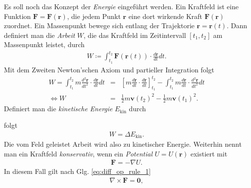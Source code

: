 \documentclass{book}
\begin{document}
Es soll noch das Konzept der \textit{Energie} eingeführt werden. Ein Kraftfeld ist eine Funktion $\mathbf{F} = \mathbf{F}\left(\mathbf{r}\right)$, die jedem Punkt $\mathbf{r}$ eine dort wirkende Kraft $\mathbf{F}\left(\mathbf{r}\right)$ zuordnet. Ein Massenpunkt bewege sich entlang der Trajektorie $\mathbf{r} = \mathbf{r}\left(t\right)$. Dann definiert man die \textit{Arbeit} $W$, die das Kraftfeld im Zeitintervall $\left[t_1, t_2\right]$ am Massenpunkt leistet, durch
%
\begin{eqnarray}
W \coloneqq \int_{t_1}^{t_2}\mathbf{F}\left(\mathbf{r}\left(t\right)\right)\cdot\frac{d\mathbf{r}}{dt}dt.
\end{eqnarray}
%
Mit dem Zweiten Newton'schen Axiom und partieller Integration folgt
%
\begin{eqnarray}
W = \int_{t_1}^{t_2}m\frac{d^2\mathbf{r}}{dt^2}\cdot\frac{d\mathbf{r}}{dt}dt & = & \left[m\frac{d\mathbf{r}}{dt}\cdot\frac{d\mathbf{r}}{dt}\right]_{t_1}^{t_2} - \int_{t_1}^{t_2}m\frac{d\mathbf{r}}{dt}\cdot\frac{d^2\mathbf{r}}{dt^2}dt\nonumber\\
\Leftrightarrow W & = & \frac{1}{2}m\mathbf{v}\left(t_2\right)^2 - \frac{1}{2}m\mathbf{v}\left(t_1\right)^2.
\end{eqnarray}
%
Definiert man die \textit{kinetische Energie} $E_{\text{kin}}$ durch
%
\begin{center}
\end{center}
%
folgt
%
\begin{eqnarray}
W = \Delta E_{\text{kin}}.
\end{eqnarray}
%
Die vom Feld geleistet Arbeit wird also zu kinetischer Energie. Weiterhin nennt man ein Kraftfeld \textit{konservativ},  wenn ein \textit{Potential} $U = U\left(\mathbf{r}\right)$ existiert mit
%
\begin{eqnarray}
\mathbf{F} = -\nabla U.
\end{eqnarray}
%
In diesem Fall gilt nach Glg. \eqref{eq:diff_op_rule_1}
%
\begin{eqnarray}
\nabla\times\mathbf{F} = \mathbf{0}, 
\end{eqnarray}
\end{document}
